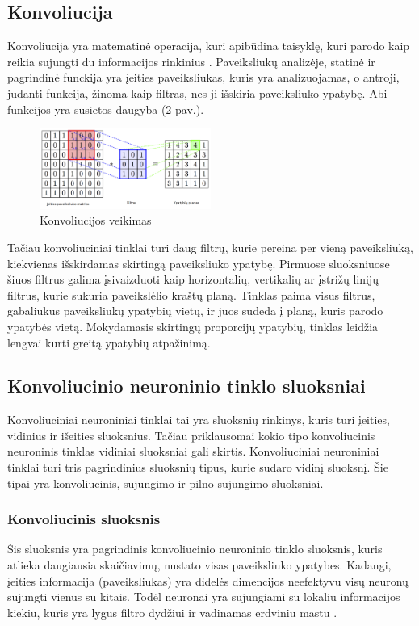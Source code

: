 \documentclass{VUMIFPSkursinis}
\begin{document}
\subsection{Konvoliucija}
Konvoliucija yra matematinė operacija, kuri apibūdina taisyklę, kuri parodo kaip reikia sujungti du informacijos rinkinius \cite{Convolution-book}. 
Paveiksliukų analizėje, statinė ir pagrindinė funckija yra įeities paveiksliukas, kuris yra analizuojamas, o antroji, judanti funkcija, žinoma 
kaip filtras, nes ji išskiria paveiksliuko ypatybę. Abi funkcijos yra susietos daugyba (2 pav.). 

\begin{figure}[h]
\centering
\includegraphics[width=0.5\textwidth]{img/Konvoliucija.png}
\caption{Konvoliucijos veikimas}
\end{figure}

Tačiau konvoliuciniai tinklai turi daug filtrų, kurie pereina per vieną paveiksliuką, kiekvienas išskirdamas skirtingą paveiksliuko ypatybę.
Pirmuose sluoksniuose šiuos filtrus galima įsivaizduoti kaip horizontalių, vertikalių ar įstrižų linijų filtrus, kurie sukuria paveikslėlio 
kraštų planą. Tinklas paima visus filtrus, gabaliukus paveiksliukų ypatybių vietų, ir juos sudeda į planą, kuris parodo ypatybės vietą. 
Mokydamasis skirtingų proporcijų ypatybių, tinklas leidžia lengvai kurti greitą ypatybių atpažinimą.

\subsection{Konvoliucinio neuroninio tinklo sluoksniai}
Konvoliuciniai neuroniniai tinklai tai yra sluoksnių rinkinys, kuris turi įeities, vidinius ir išeities sluoksnius. Tačiau priklausomai 
kokio tipo konvoliucinis neuroninis tinklas vidiniai sluoksniai gali skirtis. Konvoliuciniai neuroniniai tinklai turi tris pagrindinius 
sluoksnių tipus, kurie sudaro vidinį sluoksnį. Šie tipai yra konvoliucinis, sujungimo ir pilno sujungimo sluoksniai.

\subsubsection{Konvoliucinis sluoksnis}
Šis sluoksnis yra pagrindinis konvoliucinio neuroninio tinklo sluoksnis, kuris atlieka daugiausia skaičiavimų, nustato visas paveiksliuko ypatybes.
Kadangi, įeities informacija (paveiksliukas) yra didelės dimencijos neefektyvu visų neuronų sujungti vienus su kitais. Todėl neuronai yra sujungiami
su lokaliu informacijos kiekiu, kuris yra lygus filtro dydžiui ir vadinamas erdviniu mastu \cite{layers-CS231n}.
\end{document}
